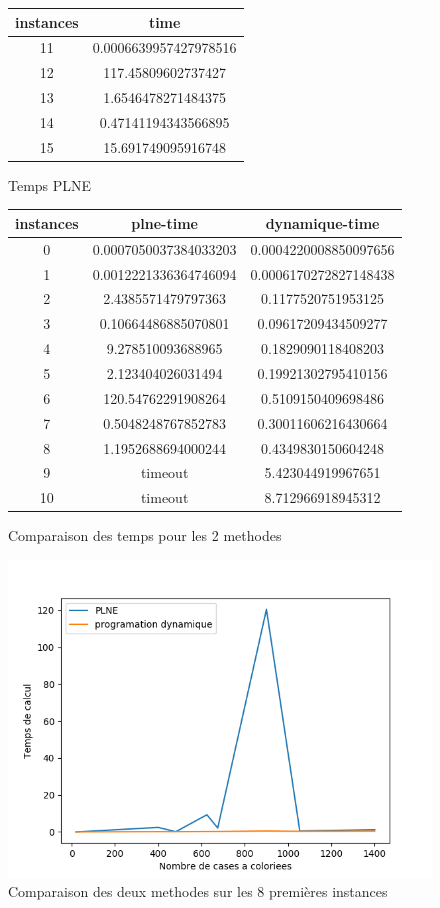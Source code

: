 \documentclass[a4paper]{memoir}
\begin{document}
\begin{figure}
  \begin{center}
    \begin{tabular}{|c||c|}
    \hline
    instances & time\\ 
    \hline
    11 & 0.0006639957427978516 \\ 
    \hline
    12 & 117.45809602737427 \\ 
    \hline
    13 & 1.6546478271484375 \\ 
    \hline
    14 & 0.47141194343566895 \\ 
    \hline
    15 & 15.691749095916748 \\ 
    \hline
    \end{tabular}
    \caption{Temps PLNE}
  \end{center}
\end{figure}

\begin{figure}
  \begin{center}
\begin{tabular}{|c||c||c|}
\hline
instances & plne-time & dynamique-time \\ 
\hline
0 & 0.0007050037384033203 & 0.0004220008850097656 \\ 
\hline
1 & 0.0012221336364746094 & 0.0006170272827148438 \\ 
\hline
2 & 2.4385571479797363 & 0.1177520751953125 \\ 
\hline
3 & 0.10664486885070801 & 0.09617209434509277 \\ 
\hline
4 & 9.278510093688965 & 0.1829090118408203 \\ 
\hline
5 & 2.123404026031494 & 0.19921302795410156 \\ 
\hline
6 & 120.54762291908264 & 0.5109150409698486 \\ 
\hline
7 & 0.5048248767852783 & 0.30011606216430664 \\ 
\hline
8 & 1.1952688694000244 & 0.4349830150604248 \\ 
\hline
9 & timeout & 5.423044919967651 \\ 
\hline
10 & timeout & 8.712966918945312 \\ 
\hline
\end{tabular}

\caption{Comparaison des temps pour les 2 methodes}
  \end{center}
  \end{figure}


\begin{figure}[h]
  \centering
  \includegraphics[width=0.75\linewidth]{../graphes/comparaison.png}
  \caption{Comparaison des deux methodes sur les 8 premières instances}
  \label{fig:graphes-comparaison}
\end{figure}

    
     
\end{document}
